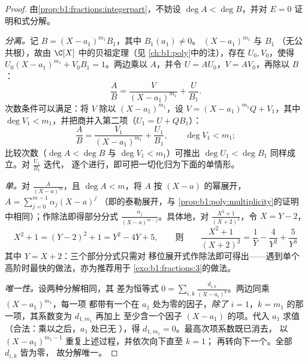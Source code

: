 \begin{proof}
由\cref{prop:b1:fractions:integerpart}，不妨设 $\deg A < \deg
B$，并对 $E = 0$ 证明和式分解。

\emph{分离。}记 $B = (X - a_1)^{m_1} B_1$，其中
$B_1(a_1) \neq 0$。 $(X-a_1)^{m_1}$ 与 $B_1$ 
（无公共根），故由 $\C[X]$ 中的贝祖定理（见
\cref{ch:b1:poly}中的注），存在 $U_0, V_0$，使得 $U_0 (X-a_1)^{m_1} +
V_0 B_1 = 1$。两边乘以 $A$，并令 $U = AU_0$，$V =
AV_0$，再除以 $B$：
\[
\frac AB = \frac{V}{(X - a_1)^{m_1}} + \frac{U}{B_1} .
\]
次数条件可以满足：将 $V$ 除以
$(X-a_1)^{m_1}$，设 $V = (X-a_1)^{m_1}Q + V_1$，其中 $\deg V_1 <
m_1$，并把商并入第二项（$U_1 = U +
QB_1$）：
\[
\frac AB = \frac{V_1}{(X - a_1)^{m_1}} + \frac{U_1}{B_1},
\qquad \deg V_1 < m_1 ;
\]
比较次数（$\deg A < \deg B$ 与 $\deg V_1 < m_1$）可推出
$\deg U_1 < \deg B_1$ 同样成立。对 $\frac{U_1}{B_1}$ 迭代，
逐个进行，即可把一切化归为下面的单情形。

\emph{单。}对 $\frac{A}{(X-a)^m}$，且 $\deg A < m$，将 $A$
按 $(X - a)$ 的幂展开，$A = \sum_{j=0}^{m-1} \alpha_j (X - a)^j$
（即的泰勒展开，与
\cref{prop:b1:poly:multiplicity}的证明中相同）；作除法即得部分分式
$\frac{\alpha_j}{(X-a)^{m-j}}$。具体地，对 $\frac{X^2 +
1}{(X+2)^3}$，令 $X = Y - 2$，
\[
X^2 + 1 = (Y - 2)^2 + 1 = Y^2 - 4Y + 5 ,
\qquad\text{则}\qquad
\frac{X^2+1}{(X+2)^3} = \frac1{Y} - \frac4{Y^2} + \frac5{Y^3}
\]
其中 $Y = X + 2$：三个部分分式只需对
移位展开式作除法即可得出——遇到单个
高阶时最快的做法，亦为推荐用于
\cref{exo:b1:fractions:3}的做法。

\emph{唯一性。}设两种分解相同，其
差为恒等式 $0 = \sum_{i,k} \frac{d_{i,k}}{(X -
a_i)^k}$。两边同乘 $(X - a_1)^{m_1}$，每一项
都带有一个在 $a_1$ 处为零的因子，\emph{除了}
$i = 1$，$k = m_1$ 的那一项，其系数变为 $d_{1,m_1}$ 再加上
至少含一个因子 $(X - a_1)$ 的项。代入
$a_1$ 求值（合法：乘以之后，$a_1$ 处已无
），得 $d_{1,m_1} = 0$。最高次项系数既已消去，
以 $(X - a_1)^{m_1 - 1}$ 重复上述过程，并依次向下直至 $k = 1$；
再转向下一个。全部 $d_{i,k}$ 皆为零，
故分解唯一。
\end{proof}

